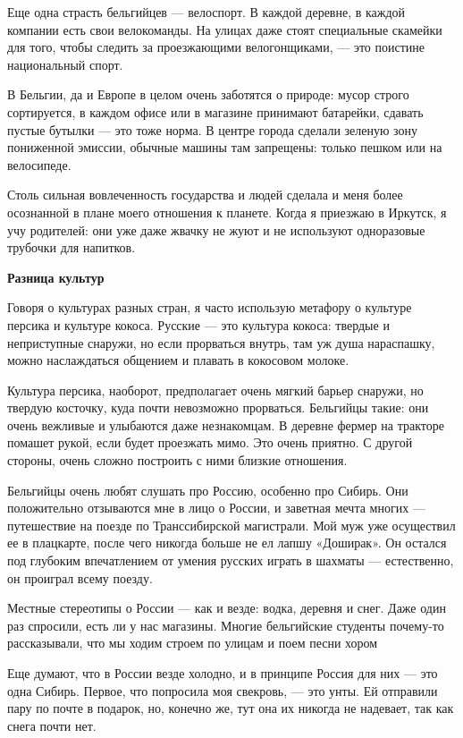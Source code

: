 Еще одна страсть бельгийцев — велоспорт. В каждой деревне, в каждой компании есть свои велокоманды. На улицах даже стоят специальные скамейки для того, чтобы следить за проезжающими велогонщиками, — это поистине национальный спорт.

В Бельгии, да и Европе в целом очень заботятся о природе: мусор строго сортируется, в каждом офисе или в магазине принимают батарейки, сдавать пустые бутылки — это тоже норма. В центре города сделали зеленую зону пониженной эмиссии, обычные машины там запрещены: только пешком или на велосипеде.

Столь сильная вовлеченность государства и людей сделала и меня более осознанной в плане моего отношения к планете. Когда я приезжаю в Иркутск, я учу родителей: они уже даже жвачку не жуют и не используют одноразовые трубочки для напитков.

\textbf{Разница культур}

Говоря о культурах разных стран, я часто использую метафору о культуре персика и культуре кокоса. Русские — это культура кокоса: твердые и неприступные снаружи, но если прорваться внутрь, там уж душа нараспашку, можно наслаждаться общением и плавать в кокосовом молоке.

Культура персика, наоборот, предполагает очень мягкий барьер снаружи, но твердую косточку, куда почти невозможно прорваться. Бельгийцы такие: они очень вежливые и улыбаются даже незнакомцам. В деревне фермер на тракторе помашет рукой, если будет проезжать мимо. Это очень приятно. С другой стороны, очень сложно построить с ними близкие отношения.

Бельгийцы очень любят слушать про Россию, особенно про Сибирь. Они положительно отзываются мне в лицо о России, и заветная мечта многих — путешествие на поезде по Транссибирской магистрали. Мой муж уже осуществил ее в плацкарте, после чего никогда больше не ел лапшу «Доширак». Он остался под глубоким впечатлением от умения русских играть в шахматы — естественно, он проиграл всему поезду.

\begin{fancyquotes}
    Местные стереотипы о России — как и везде: водка, деревня и снег. Даже один раз спросили, есть ли у нас магазины. Многие бельгийские студенты почему-то рассказывали, что мы ходим строем по улицам и поем песни хором
\end{fancyquotes}

Еще думают, что в России везде холодно, и в принципе Россия для них — это одна Сибирь. Первое, что попросила моя свекровь, — это унты. Ей отправили пару по почте в подарок, но, конечно же, тут она их никогда не надевает, так как снега почти нет.

